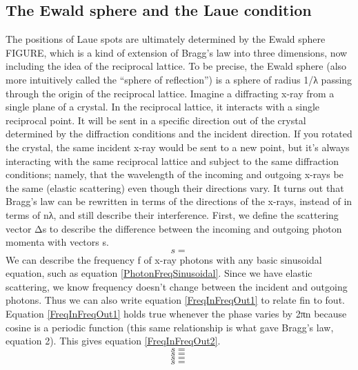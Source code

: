 \subsection{The Ewald sphere and the Laue condition}
The positions of Laue spots are ultimately determined by the Ewald sphere FIGURE, which is a kind of extension of Bragg’s law into three dimensions, now including the idea of the reciprocal lattice. To be precise, the Ewald sphere (also more intuitively called the “sphere of reflection”) is a sphere of radius 1/λ passing through the origin of the reciprocal lattice. 
Imagine a diffracting x-ray from a single plane of a crystal. In the reciprocal lattice, it interacts with a single reciprocal point. It will be sent in a specific direction out of the crystal determined by the diffraction conditions and the incident direction. If you rotated the crystal, the same incident x-ray would be sent to a new point, but it’s always interacting with the same reciprocal lattice and subject to the same diffraction conditions; namely, that the wavelength of the incoming and outgoing x-rays be the same (elastic scattering) even though their directions vary.
It turns out that Bragg’s law can be rewritten in terms of the directions of the x-rays, instead of in terms of nλ, and still describe their interference. First, we define the scattering vector Δs to describe the difference between the incoming and outgoing photon momenta with vectors s.
\begin{equation}
    s=
    \label{ScattVec}
\end{equation}
We can describe the frequency f of x-ray photons with any basic sinusoidal equation, such as equation \ref{PhotonFreqSinusoidal}. Since we have elastic scattering, we know frequency doesn’t change between the incident and outgoing photons. Thus we can also write equation \ref{FreqInFreqOut1} to relate fin to fout. Equation \ref{FreqInFreqOut1} holds true whenever the phase varies by 2πn because cosine is a periodic function (this same relationship is what gave Bragg’s law, equation 2). This gives equation \ref{FreqInFreqOut2}. 
\begin{equation}
    s=
    \label{PhotonFreqSinusoidal}
\end{equation}
\begin{equation}
    s=
    \label{FreqInFreqOut1}
\end{equation}
\begin{equation}
    s=
    \label{FreqInFreqOut2}
\end{equation}
\begin{equation}
    s=
    \label{FreqInFreqOut3}
\end{equation}
